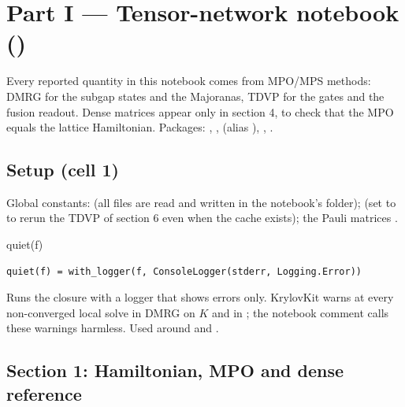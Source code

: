 \section{Part I --- Tensor-network notebook ()}

Every reported quantity in this notebook comes from MPO/MPS methods: DMRG for the subgap states and the Majoranas, TDVP for the
gates and the fusion readout. Dense matrices appear only in section 4, to check that the MPO equals the lattice Hamiltonian.
Packages: , ,  (alias ), , .

\subsection{Setup (cell 1)}

Global constants:  (all files are read and written in the notebook's folder);  (set to
 to rerun the TDVP of section 6 even when the cache exists); the Pauli matrices .

\begin{function}{quiet(f)}
\begin{Verbatim}
quiet(f) = with_logger(f, ConsoleLogger(stderr, Logging.Error))
\end{Verbatim}
Runs the closure  with a logger that shows errors only. KrylovKit warns at every non-converged local solve in DMRG on $K$ and in
; the notebook comment calls these warnings harmless. Used around  and .
\end{function}

\subsection{Section 1: Hamiltonian, MPO and dense reference}

